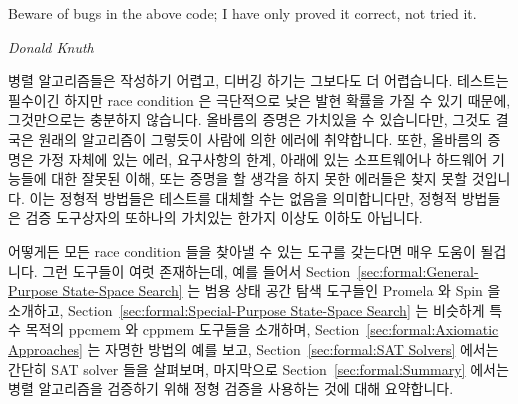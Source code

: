 

\epigraph{Beware of bugs in the above code; I have only proved it correct,
	  not tried it.}{\emph{Donald Knuth}}


병렬 알고리즘들은 작성하기 어렵고, 디버깅 하기는 그보다도 더 어렵습니다.
테스트는 필수이긴 하지만 race condition 은 극단적으로 낮은 발현 확률을 가질 수
있기 때문에, 그것만으로는 충분하지 않습니다.
올바름의 증명은 가치있을 수 있습니다만, 그것도 결국은 원래의 알고리즘이
그렇듯이 사람에 의한 에러에 취약합니다.
또한, 올바름의 증명은 가정 자체에 있는 에러, 요구사항의 한계, 아래에 있는
소프트웨어나 하드웨어 기능들에 대한 잘못된 이해, 또는 증명을 할 생각을 하지
못한 에러들은 찾지 못할 것입니다.
이는 정형적 방법들은 테스트를 대체할 수는 없음을 의미합니다만, 정형적 방법들은
검증 도구상자의 또하나의 가치있는 한가지 이상도 이하도 아닙니다.
\iffalse

Parallel algorithms can be hard to write, and even harder to debug.
Testing, though essential, is insufficient, as fatal race conditions
can have extremely low probabilities of occurrence.
Proofs of correctness can be valuable, but in the end are just as
prone to human error as is the original algorithm.
In addition, a proof of correctness cannot be expected to find errors
in your assumptions, shortcomings in the requirements,
misunderstandings of the underlying software or hardware primitives,
or errors that you did not think to construct a proof for.
This means that formal methods can never replace testing, however,
formal methods are nevertheless a valuable addition to your validation toolbox.
\fi

어떻게든 모든 race condition 들을 찾아낼 수 있는 도구를 갖는다면 매우 도움이
될겁니다.
그런 도구들이 여럿 존재하는데, 예를 들어서
Section~\ref{sec:formal:General-Purpose State-Space Search}
는 범용 상태 공간 탐색 도구들인 Promela 와 Spin 을 소개하고,
Section~\ref{sec:formal:Special-Purpose State-Space Search}
는 비슷하게 특수 목적의 ppcmem 와 cppmem 도구들을 소개하며,
Section~\ref{sec:formal:Axiomatic Approaches}
는 자명한 방법의 예를 보고,
Section~\ref{sec:formal:SAT Solvers}
에서는 간단히 SAT solver 들을 살펴보며, 마지막으로
Section~\ref{sec:formal:Summary}
에서는 병렬 알고리즘을 검증하기 위해 정형 검증을 사용하는 것에 대해 요약합니다.
\iffalse

